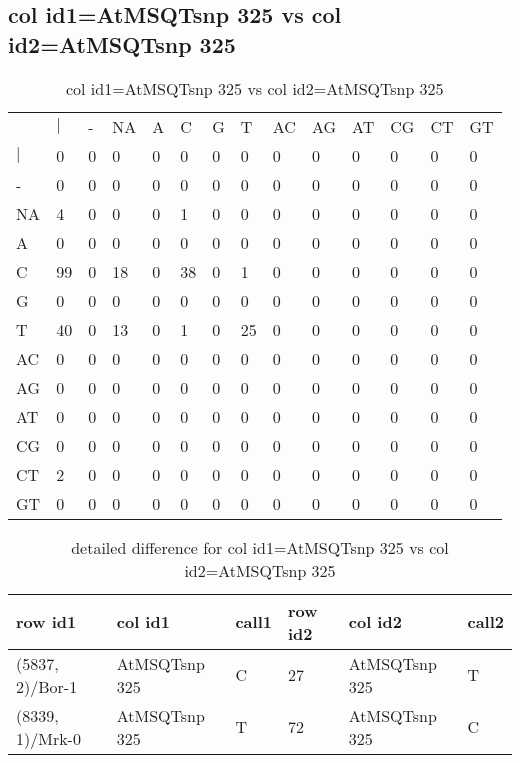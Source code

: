 \subsection{col id1=AtMSQTsnp 325 vs col id2=AtMSQTsnp 325}
\begin{center}
\begin{longtable}{|l|l|l|l|l|l|l|l|l|l|l|l|l|l|}
\caption{col id1=AtMSQTsnp 325 vs col id2=AtMSQTsnp 325} \label{table_dm658}\\
\hline
\\
\hline
&$|$&-&NA&A&C&G&T&AC&AG&AT&CG&CT&GT\\
$|$&0&0&0&0&0&0&0&0&0&0&0&0&0\\
-&0&0&0&0&0&0&0&0&0&0&0&0&0\\
NA&4&0&0&0&1&0&0&0&0&0&0&0&0\\
A&0&0&0&0&0&0&0&0&0&0&0&0&0\\
C&99&0&18&0&38&0&1&0&0&0&0&0&0\\
G&0&0&0&0&0&0&0&0&0&0&0&0&0\\
T&40&0&13&0&1&0&25&0&0&0&0&0&0\\
AC&0&0&0&0&0&0&0&0&0&0&0&0&0\\
AG&0&0&0&0&0&0&0&0&0&0&0&0&0\\
AT&0&0&0&0&0&0&0&0&0&0&0&0&0\\
CG&0&0&0&0&0&0&0&0&0&0&0&0&0\\
CT&2&0&0&0&0&0&0&0&0&0&0&0&0\\
GT&0&0&0&0&0&0&0&0&0&0&0&0&0\\
\hline
\end{longtable}
\end{center}

\begin{center}
\begin{longtable}{|l|l|l|l|l|l|}
\caption{detailed difference for col id1=AtMSQTsnp 325 vs col id2=AtMSQTsnp 325} \label{table_dm659}\\
\hline
row id1&col id1&call1&row id2&col id2&call2\\
\hline
(5837, 2)/Bor-1&AtMSQTsnp 325&C&27&AtMSQTsnp 325&T\\
(8339, 1)/Mrk-0&AtMSQTsnp 325&T&72&AtMSQTsnp 325&C\\
\hline
\end{longtable}
\end{center}

